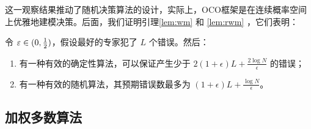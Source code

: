这一观察结果推动了随机决策算法的设计，实际上，OCO框架是在连续概率空间上优雅地建模决策。后面，我们证明引理\ref{lem:wm} 和 \ref{lem:rwm} ，它们表明：
\begin{theorem}
令 $\varepsilon \in (0,\frac{1}{2} )$，假设最好的专家犯了 $L$ 个错误。然后：
\begin{enumerate}
\item
有一种有效的确定性算法，可以保证产生少于 $2(1+\epsilon)L + \frac{2\log N}{\epsilon}$ 的错误；
\item
有一种有效的随机算法，其预期错误数最多为 $(1+\epsilon)L  + \frac{\log N}{\epsilon}$。
\end{enumerate}
\end{theorem}


\subsection {
	加权多数算法
	}

